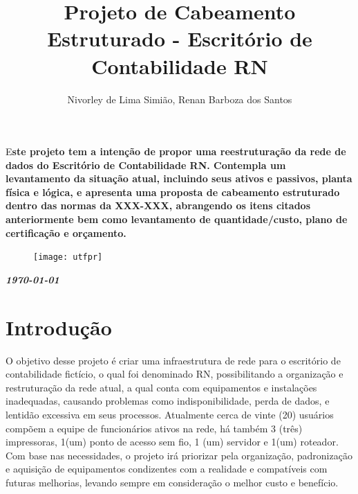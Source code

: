 \documentclass[	DIV=calc,%
							paper=a4,%
							fontsize=12pt,%
							onecolumn]{scrartcl}	 					%
\title{Projeto de Cabeamento Estruturado - Escritório de Contabilidade RN}					%
\author{Nivorley de Lima Simião, Renan Barboza dos Santos}  	%
\date{}																				%
\newcommand{\initial}[1]{%
     \lettrine[lines=3,lhang=0.3,nindent=0em]{
     				\color{DarkGoldenrod}
     				{\textsf{#1}}}{}}
\begin{document}
\maketitle
\thispagestyle{fancy} 	
\thispagestyle{empty}		%




\initial{E}\textbf{ste projeto tem a intenção de propor uma reestruturação da rede de dados do Escritório de Contabilidade RN. Contempla um levantamento da situação atual, incluindo seus ativos e passivos, planta física e lógica, e apresenta uma proposta de cabeamento estruturado dentro das normas da XXX-XXX, abrangendo os itens citados anteriormente bem como levantamento de quantidade/custo, plano de certificação e orçamento.}

\begin{figure}
	\centering
	\texttt{[image: utfpr]}
\end{figure}

\vspace{3cm}
\centerline{\textit{\textbf{\today}}}

\clearpage
    \renewcommand*\listfigurename{Lista de figuras}
\listoffigures

\renewcommand*\listtablename{Lista de tabelas}
\listoftables




\clearpage
\renewcommand{\contentsname}{Sumário}
\tableofcontents
\clearpage

\section{Introdução}
O objetivo desse projeto é criar uma infraestrutura de rede para o escritório de contabilidade fictício, o qual foi denominado RN, possibilitando a organização e restruturação da rede atual, a qual conta com equipamentos e instalações inadequadas, causando problemas como indisponibilidade, perda de dados, e lentidão excessiva em seus processos. 
Atualmente cerca de vinte (20) usuários compõem a equipe de funcionários ativos na rede, há também 3 (três) impressoras, 1(um) ponto de acesso sem fio, 1 (um) servidor e 1(um) roteador.
Com base nas necessidades, o projeto irá priorizar pela organização, padronização e aquisição de equipamentos condizentes com a realidade e compatíveis com futuras melhorias, levando sempre em consideração o melhor custo e benefício. 
\end{document}
